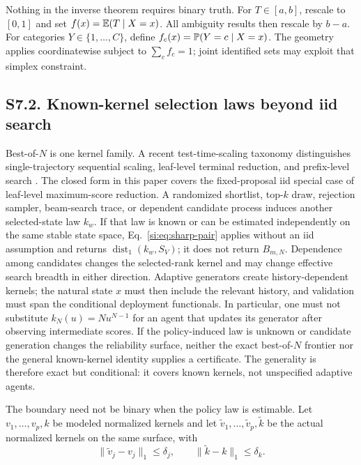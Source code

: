 Nothing in the inverse theorem requires binary truth. For $T\in[a,b]$, rescale to $[0,1]$ and set $f(x)=\mathbb{E}(T\mid X=x)$. All ambiguity results then rescale by $b-a$. For categories $Y\in\{1,\ldots,C\}$, define $f_c(x)=\mathbb{P}(Y=c\mid X=x)$. The geometry applies coordinatewise subject to $\sum_cf_c=1$; joint identified sets may exploit that simplex constraint.

\subsection*{S7.2. Known-kernel selection laws beyond iid search}

Best-of-$N$ is one kernel family. A recent test-time-scaling taxonomy distinguishes single-trajectory sequential scaling, leaf-level terminal reduction, and prefix-level search \citep{hariri2026}. The closed form in this paper covers the fixed-proposal iid special case of leaf-level maximum-score reduction. A randomized shortlist, top-$k$ draw, rejection sampler, beam-search trace, or dependent candidate process induces another selected-state law $k_w$. If that law is known or can be estimated independently on the same stable state space, Eq.~\ref{si:eq:sharp-pair} applies without an iid assumption and returns $\operatorname{dist}_1(k_w,S_V)$; it does not return $B_{m,N}$. Dependence among candidates changes the selected-rank kernel and may change effective search breadth in either direction. Adaptive generators create history-dependent kernels; the natural state $x$ must then include the relevant history, and validation must span the conditional deployment functionals. In particular, one must not substitute $k_N(u)=Nu^{N-1}$ for an agent that updates its generator after observing intermediate scores. If the policy-induced law is unknown or candidate generation changes the reliability surface, neither the exact best-of-$N$ frontier nor the general known-kernel identity supplies a certificate. The generality is therefore exact but conditional: it covers known kernels, not unspecified adaptive agents.

The boundary need not be binary when the policy law is estimable. Let $v_1,\ldots,v_p,k$ be modeled normalized kernels and let $\widetilde v_1,\ldots,\widetilde v_p,\widetilde k$ be the actual normalized kernels on the same surface, with
\begin{equation}
\|\widetilde v_j-v_j\|_1\le\delta_j,
\qquad
\|\widetilde k-k\|_1\le\delta_k.
\label{si:eq:kernel-errors}
\end{equation}

